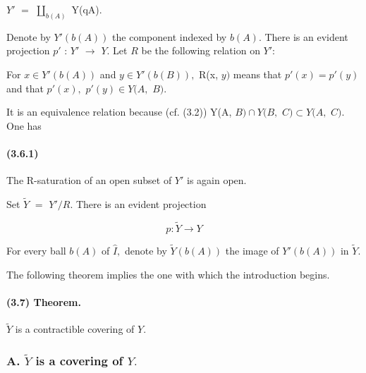 \documentclass[10pt,a4paper]{article}
\begin{document}
\ensuremath{Y'} \ensuremath{=} \ensuremath{\coprod_{b(A)}} Y(qA).\par


Denote by \ensuremath{Y'(b(A))} the component indexed by \ensuremath{b(A).} There is an evident projection \ensuremath{p'} : \ensuremath{Y'} \ensuremath{\longrightarrow{}} \ensuremath{Y.} Let \ensuremath{R} be the following relation on \ensuremath{Y':}\par

For \ensuremath{x\in{}Y'(b(A))} and \ensuremath{y\in{}Y'(b(B)),} R(x, \ensuremath{y)} means that \ensuremath{p'(x)=p'(y)} and that \ensuremath{p'(x),} \ensuremath{p'(y)\in{}Y(A,} \ensuremath{B).}\par

It is an equivalence relation because (cf. (3.2)) Y(A, \ensuremath{B)\cap{}Y(B,} \ensuremath{C)\subset{}Y(A,} \ensuremath{C).} One has\par

\paragraph{(3.6.1)} The R-saturation of an open subset of \ensuremath{Y'} is again open.

Set \ensuremath{\widetilde{Y}} \ensuremath{=} \ensuremath{Y'/R.} There is an evident projection\par

\[
p : \widetilde{Y} \longrightarrow{} Y
\]

For every ball \ensuremath{b(A)} of \ensuremath{\widehat{I},} denote by \ensuremath{\widetilde{Y}(b(A))} the image of \ensuremath{Y'(b(A))} in \ensuremath{\widetilde{Y}.}\par

The following theorem implies the one with which the introduction begins.\par

\paragraph{(3.7) Theorem.} \ensuremath{\widetilde{Y}} is a contractible covering of \ensuremath{Y.}

\subsubsection*{A. \ensuremath{\widetilde{Y}} is a covering of \ensuremath{Y.}}
\end{document}
